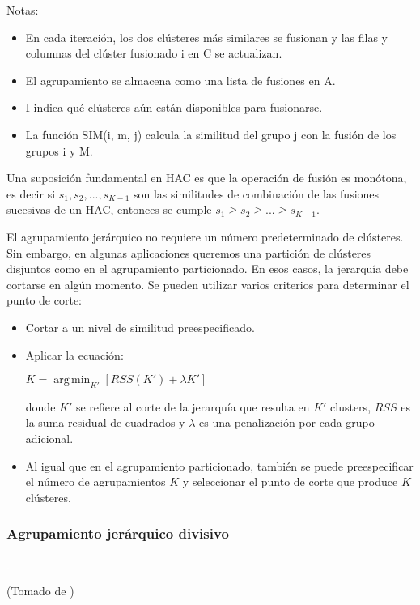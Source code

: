 \documentclass{llncs}
\DeclareMathOperator*{\argmin}{arg\,min}
\begin{document}
Notas: 
\begin{itemize}
	\item En cada iteración, los dos clústeres m\'as similares se fusionan y las filas y columnas del clúster fusionado i en C se actualizan.
	\item El agrupamiento se almacena como una lista de fusiones en A.
	\item I indica qué clústeres aún están disponibles para fusionarse. 
	\item La función SIM(i, m, j) calcula la similitud del grupo j con la fusión de los grupos i y M.
\end{itemize}

Una suposición fundamental en HAC es que la operación de fusión es mon\'otona, es decir si $ s_{1}, s_{2}, . . . , s_{K-1}$ son las similitudes de combinación de las fusiones sucesivas de un HAC, entonces se cumple $ s_{1} \geq s_{2} \geq . . . \geq s_{K-1}$.

El agrupamiento jerárquico no requiere un número predeterminado de clústeres. Sin embargo, en algunas aplicaciones queremos una partición de clústeres disjuntos como en el agrupamiento particionado. En esos casos, la jerarquía debe cortarse en algún momento. Se pueden utilizar varios criterios para determinar el punto de corte:
\begin{itemize}
	\item Cortar a un nivel de similitud preespecificado.
	\item  Aplicar la ecuación:
	\begin{center}
		$K = \argmin_{K'}[RSS(K') + \lambda K'] $
	\end{center}
	donde $ K' $ se refiere al corte de la jerarquía que resulta en $ K' $ clusters, $ RSS $ es la suma residual de cuadrados y $\lambda$ es una penalización por cada grupo adicional.
	\item Al igual que en el agrupamiento particionado, también se puede preespecificar el número de agrupamientos $ K $ y seleccionar el punto de corte que produce $ K $ cl\'usteres.
\end{itemize}

\subsubsection{Agrupamiento jer\'arquico divisivo}

\textcolor{white}{.}
\begin{flushright}
	\scriptsize*(Tomado de \cite{B1})
	\normalsize
\end{flushright}
\end{document}
